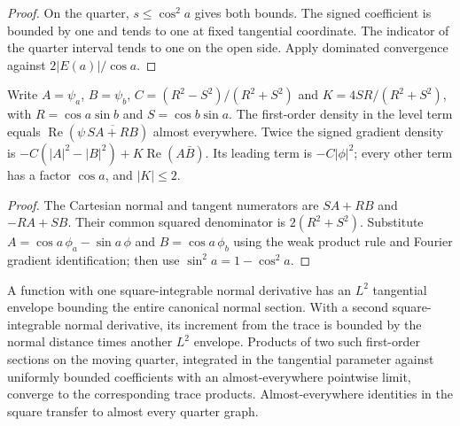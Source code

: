 \begin{proof}
\leanok
On the quarter, $s\le\cos^2 a$ gives both bounds. The signed coefficient
is bounded by one and tends to one at fixed tangential coordinate. The
indicator of the quarter interval tends to one on the open side.
Apply dominated convergence against $2|E(a)|/\cos a$.
\end{proof}

\begin{lemma}
\label{lem:mixed-level-density}
\leanok
Write $A=\psi_a$, $B=\psi_b$, $C=(R^2-S^2)/(R^2+S^2)$ and
$K=4SR/(R^2+S^2)$, with $R=\cos a\sin b$ and $S=\cos b\sin a$.
The first-order density in the level term equals
$\operatorname{Re}(\psi\,\overline{SA+RB})$ almost everywhere.
Twice the signed gradient density is
$-C(|A|^2-|B|^2)+K\operatorname{Re}(A\bar B)$.
Its leading term is $-C|\phi|^2$; every other term has a factor $\cos a$,
and $|K|\le 2$.
\end{lemma}

\begin{proof}
\leanok
The Cartesian normal and tangent numerators are $SA+RB$ and $-RA+SB$.
Their common squared denominator is $2(R^2+S^2)$.
Substitute $A=\cos a\,\phi_a-\sin a\,\phi$ and $B=\cos a\,\phi_b$ using
the weak product rule and Fourier gradient identification; then use
$\sin^2a=1-\cos^2a$.
\end{proof}

\begin{lemma}
\label{lem:mixed-quarter-section-envelope}
\leanok
A function with one square-integrable normal derivative has an $L^2$
tangential envelope bounding the entire canonical normal section.
With a second square-integrable normal derivative, its increment from
the trace is bounded by the normal distance times another $L^2$
envelope. Products of two such first-order sections on the moving
quarter, integrated in the tangential parameter against uniformly
bounded coefficients with an almost-everywhere pointwise limit, converge
to the corresponding trace products. Almost-everywhere identities in
the square transfer to almost every quarter graph.
\end{lemma}


